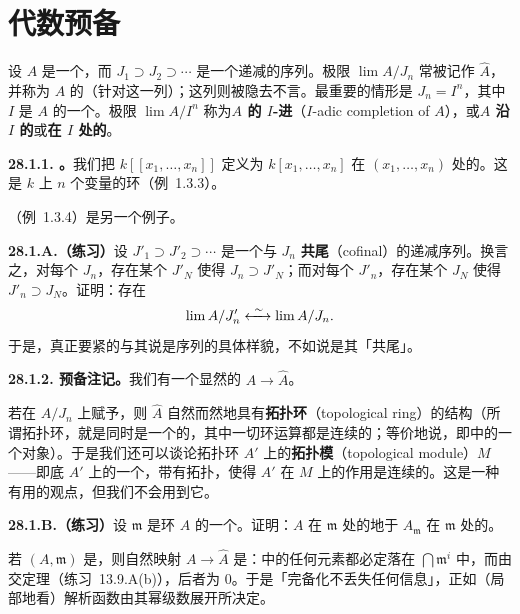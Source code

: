 
\section{代数预备}

设 $A$ 是一个\trRing，而 $J_1\supset J_2\supset\cdots$ 是一个递减的\trIdeal{}序列。极限 $\lim A/J_n$ 常被记作 $\hat{A}$，并称为 $A$ 的\trCompletion（针对这一列\trIdeal）；这列\trIdeal{}则被隐去不言。\trCompletion{}最重要的情形是 $J_n=I^n$，其中 $I$ 是 $A$ 的一个\trIdeal。极限 $\lim A/I^n$ 称为\textbf{$A$ 的 $I$-进\trCompletion}（$I$-adic completion of $A$），或\textbf{$A$ 沿 $I$ 的\trCompletion}或\textbf{在 $I$ 处的\trCompletion}。

\textbf{28.1.1. \trhExample。}\quad 我们把 $k[[x_1,\dots,x_n]]$ 定义为 $k[x_1,\dots,x_n]$ 在\trMaximalIdeal{} $(x_1,\dots,x_n)$ 处的\trCompletion。这是 $k$ 上 $n$ 个变量的\trFormalPowerSeries{}环（\mbox{例~1.3.3}）。

\trPadics{}（\mbox{例~1.3.4}）是另一个例子。

\textbf{28.1.A.（练习）}\quad 设 $J'_1\supset J'_2\supset\cdots$ 是一个与 $J_n$ \textbf{共尾}（cofinal）的递减\trIdeal{}序列。换言之，对每个 $J_n$，存在某个 $J'_N$ 使得 $J_n\supset J'_N$；而对每个 $J'_n$，存在某个 $J_N$ 使得 $J'_n\supset J_N$。证明：存在\trCanonical{}\trIsomorphism
\[
\lim A/J'_n \xleftrightarrow{\ \sim\ } \lim A/J_n.
\]
于是，真正要紧的与其说是\trIdeal{}序列的具体样貌，不如说是其「共尾」\trEquivalenceClass。

\textbf{28.1.2. 预备注记。}\quad 我们有一个显然的\trMorphism{} $A\to\hat{A}$。

若在 $A/J_n$ 上赋予\trDiscreteTopology，则 $\hat{A}$ 自然而然地具有\textbf{拓扑环}（topological ring）的结构（所谓拓扑环，就是同时是一个\trTopologicalSpace{}的\trRing，其中一切环运算都是连续的；等价地说，即\trTopologicalSpace{}\trCategory{}中的一个\trRing{}对象）。于是我们还可以谈论拓扑环 $A'$ 上的\textbf{拓扑模}（topological module）$M$——即底\trRing{} $A'$ 上的一个\trModule，带有拓扑，使得 $A'$ 在 $M$ 上的作用是连续的。这是一种有用的观点，但我们不会用到它。

\textbf{28.1.B.（练习）}\quad 设 $\mathfrak{m}$ 是环 $A$ 的一个\trMaximalIdeal。证明：$A$ 在 $\mathfrak{m}$ 处的\trCompletion{}\trCanonical{}地\trIsomorphic{}于 $A_{\mathfrak{m}}$ 在 $\mathfrak{m}$ 处的\trCompletion。

若 $(A,\mathfrak{m})$ 是\trNoether{}\trLocalRing，则自然映射 $A\to\hat{A}$ 是\trInjectiveMap：\trKernel{}中的任何元素都必定落在 $\bigcap\mathfrak{m}^i$ 中，而由\trKrull{}交定理（\mbox{练习~13.9.A}(b)），后者为 $0$。于是「完备化不丢失任何信息」，正如（局部地看）解析函数由其幂级数展开所决定。

